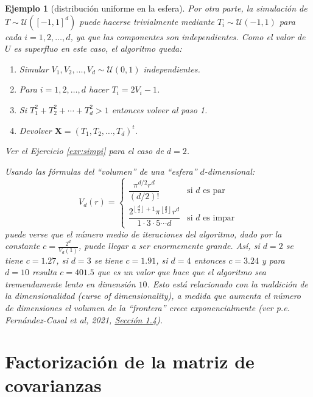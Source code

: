 \documentclass[
]{book}
\theoremstyle{break}
\newtheorem{example}{Ejemplo}[chapter]
\theoremstyle{nonumberplain}
\begin{document}
\begin{example}[distribución uniforme en la esfera]
Por otra parte, la simulación de \(T \sim \mathcal{U}\left( \left[ -1,1\right] ^{d}\right)\) puede hacerse trivialmente mediante
\(T_i \sim \mathcal{U}\left( -1, 1 \right)\)
para cada \(i=1,2,\ldots,d\), ya que las
componentes son independientes. Como el valor de \(U\) es superfluo en
este caso, el algoritmo queda:

\begin{enumerate}
\def\labelenumi{\arabic{enumi}.}
\item
  Simular \(V_1,V_2,\ldots,V_d \sim \mathcal{U}\left( 0,1\right)\) independientes.
\item
  Para \(i = 1, 2, \ldots, d\) hacer \(T_i = 2V_i - 1\).
\item
  Si \(T_1^2 + T_2^2 + \cdots + T_d^2 > 1\) entonces volver al paso 1.
\item
  Devolver \(\mathbf{X} = \left( T_1, T_2, \ldots, T_d \right)^t\).
\end{enumerate}

Ver el Ejercicio \ref{exr:simpi} para el caso de \(d=2\).

Usando las fórmulas del ``volumen'' de una ``esfera'' \(d\)-dimensional:
\[V_d\left( r\right)  =\left\{
\begin{array}{ll}
\dfrac{\pi^{d/2}r^{d}}{\left( d/2\right)  !} & \text{si } d \text{ es par}\\
\dfrac{2^{\left\lfloor \frac{d}{2}\right\rfloor +1}\pi^{\left\lfloor \frac{d}{2}\right\rfloor }r^{d}}{1\cdot3\cdot5\cdots d} & \text{si } d \text{ es impar}
\end{array}\right.\]
puede verse que el número medio de iteraciones del algoritmo, dado por la constante
\(c=\frac{2^{d}}{V_d\left(1 \right)}\), puede llegar a ser enormemente grande.
Así, si \(d=2\) se tiene \(c=1.27\), si \(d=3\) se tiene \(c=1.91\), si \(d=4\) entonces \(c=3.24\) y para
\(d=10\) resulta \(c=401.5\) que es un valor que hace que el algoritmo sea
tremendamente lento en dimensión \(10\).
Esto está relacionado con la \emph{maldición de la dimensionalidad} (curse of dimensionality), a medida que aumenta el número de dimensiones el volumen de la ``frontera'' crece exponencialmente (ver p.e. Fernández-Casal et al, 2021, \href{https://rubenfcasal.github.io/aprendizaje_estadistico/dimen-curse.html}{Sección 1.4}).
\end{example}

\hypertarget{fact-cov}{%
\section{Factorización de la matriz de covarianzas}\label{fact-cov}}
\end{document}
